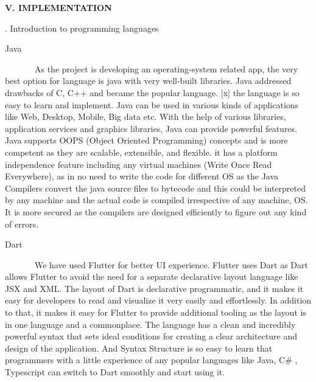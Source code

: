 \documentclass[12pt]{report}
\renewcommand{\_}{\kern-1.5pt\textunderscore\kern-1.5pt}
\begin{document}
\begin{multicols}{2}
\vspace{\baselineskip}

\vspace{\baselineskip}

\vspace{\baselineskip}
\begin{Center}
{\fontsize{10pt}{12.0pt}\selectfont \textbf{V. IMPLEMENTATION}}
\end{Center}

\vspace{\baselineskip}
\setlength{\parskip}{12.0pt}
\begin{justify}
{\fontsize{10pt}{12.0pt}. Introduction to programming languages }
\end{justify}
\begin{justify}
{\fontsize{10pt}{12.0pt} Java}
\end{justify}
\begin{justify}
{\fontsize{10pt}{12.0pt}\selectfont \ \ \ \ \ \ \  As the project is developing an operating-system related app, the very best option for language is java with very well-built libraries. Java addressed drawbacks of C, C++ and became the popular language. [x] the language is so easy to learn and implement. Java can be used in various kinds of applications like Web, Desktop, Mobile, Big data etc. With the help of various libraries, application services and graphics libraries, Java can provide powerful features. Java supports OOPS (Object Oriented Programming) concepts and is more competent as they are scalable, extensible, and flexible. it has a platform independence feature including any virtual machines (Write Once Read Everywhere), as in no need to write the code for different OS as the Java Compilers convert the java source files to bytecode and this could be interpreted by any machine and the actual code is compiled irrespective of any machine, OS. It is more secured as the compilers are designed efficiently to figure out any kind of errors.\par}
\end{justify}
\begin{justify}
{\fontsize{10pt}{12.0pt} Dart}
\end{justify}
\begin{justify}
{\fontsize{10pt}{12.0pt}\selectfont \ \ \ \ \ \ \  \tab We have used Flutter for better UI experience. Flutter uses Dart as Dart allows Flutter to avoid the need for a separate declarative layout language like JSX and XML. The layout of Dart is declarative programmatic, and it makes it easy for developers to read and visualize it very easily and effortlessly. In addition to that, it makes it easy for Flutter to provide additional tooling as the layout is in one language and a commonplace. The language has a clean and incredibly powerful syntax that sets ideal conditions for creating a clear architecture and design of the application. And Syntax Structure is so easy to learn that programmers with a little experience of any popular languages like Java, C$\#$ , Typescript can switch to Dart smoothly and start using it.\par}

\end{justify}
\end{multicols}
\end{document}
